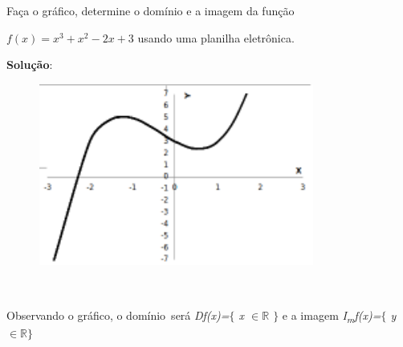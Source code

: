 \begin{texemplo}
Faça o gráfico, determine o domínio e a imagem da função 

\quad  \( f \left( x \right) =x^{3}+x^{2}-2x+3 \) usando uma planilha eletrônica.

\textbf{Solução}: 

\begin{figure}[H]
	\begin{Center}
		\includegraphics[width=3.57in,height=2.36in]{capitulos/outras_funcoes/media/image21.pdf}
	\end{Center}
\end{figure}

~~

Observando o gráfico, o domínio~será \textit{Df(x)=$ \{ $ x $ \in \mathbb{R} $ \textbf{ }$ \} $ } e a imagem \textit{I\textsubscript{m}f(x)=$ \{ $ y $ \in \mathbb{R} \} $ } \qedsymbol{}

\end{texemplo}

